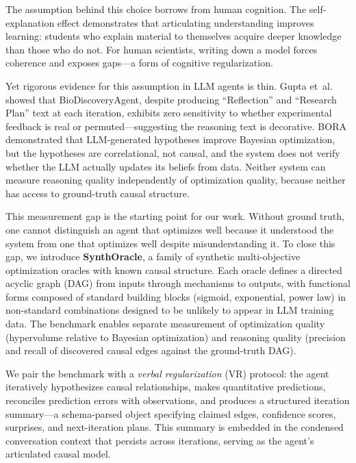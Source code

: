 \documentclass[11pt,letterpaper]{article}
\begin{document}
The assumption behind this choice borrows from human cognition. The
self-explanation effect \cite{chi1994selfexplanation} demonstrates that
articulating understanding improves learning: students who explain
material to themselves acquire deeper knowledge than those who do not.
For human scientists, writing down a model forces coherence and exposes
gaps---a form of cognitive regularization.

Yet rigorous evidence for this assumption in LLM agents is thin. Gupta
et~al.\ \cite{gupta2025arewethereyet} showed that BioDiscoveryAgent,
despite producing ``Reflection'' and ``Research Plan'' text at each
iteration, exhibits zero sensitivity to whether experimental feedback is
real or permuted---suggesting the reasoning text is decorative. BORA
\cite{cisse2025bora} demonstrated that LLM-generated hypotheses improve
Bayesian optimization, but the hypotheses are correlational, not causal,
and the system does not verify whether the LLM actually updates its
beliefs from data. Neither system can measure reasoning quality
independently of optimization quality, because neither has access to
ground-truth causal structure.

This measurement gap is the starting point for our work. Without ground
truth, one cannot distinguish an agent that optimizes well because it
understood the system from one that optimizes well despite misunderstanding
it. To close this gap, we introduce \textbf{SynthOracle}, a family of
synthetic multi-objective optimization oracles with known causal
structure. Each oracle defines a directed acyclic graph (DAG) from inputs
through mechanisms to outputs, with functional forms composed of standard
building blocks (sigmoid, exponential, power law) in non-standard
combinations designed to be unlikely to appear in LLM training
data. The benchmark enables separate measurement of optimization quality
(hypervolume relative to Bayesian optimization) and reasoning quality
(precision and recall of discovered causal edges against the ground-truth
DAG).

We pair the benchmark with a \emph{verbal regularization} (VR) protocol:
the agent iteratively hypothesizes causal relationships, makes
quantitative predictions, reconciles prediction errors with observations,
and produces a structured iteration summary---a schema-parsed object
specifying claimed edges, confidence scores, surprises, and
next-iteration plans. This summary is embedded in the condensed
conversation context that persists across iterations, serving as the
agent's articulated causal model.
\end{document}
